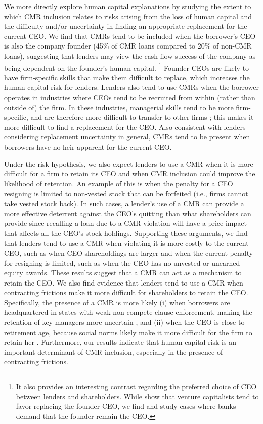 \documentclass[a4paper,12pt]{article}
\begin{document}
We more directly explore human capital explanations by studying the extent to which CMR inclusion relates to risks arising from the loss of human capital and the difficulty and/or uncertainty in finding an appropriate replacement for the current CEO.
We find that CMRs tend to be included when the borrower's CEO is also the company founder (45\% of CMR loans compared to 20\% of non-CMR loans),
suggesting that lenders may view the cash flow success of the company as being dependent on the founder's human capital.%
  \footnote{It also provides an interesting contrast regarding the preferred choice of CEO between lenders and shareholders. While \cite{Kaplan_2009} show that venture capitalists tend to favor replacing the founder CEO, we find and study cases where banks demand that the founder remain the CEO.}
Founder CEOs are likely to have firm-specific skills that make them difficult to replace, which increases the human capital risk for lenders.
Lenders also tend to use CMRs when the borrower operates in industries where CEOs tend to be recruited from within (rather than outside of) the firm.
In these industries, managerial skills tend to be more firm-specific, and are therefore more difficult to transfer to other firms \citep{Cremers_2014}; this makes it more difficult to find a replacement for the CEO.
Also consistent with lenders considering replacement uncertainty in general, CMRs tend to be present when borrowers have no heir apparent for the current CEO.



Under the risk hypothesis, we also expect lenders to use a CMR when it is more difficult for a firm to retain its CEO and when CMR inclusion could improve the likelihood of retention.
An example of this is when the penalty for a CEO resigning is limited to non-vested stock that can be forfeited (i.e., firms cannot take vested stock back).
In such cases, a lender's use of a CMR can provide a more effective deterrent against the CEO's quitting than what shareholders can provide since recalling a loan due to a CMR violation will have a price impact that affects all the CEO's stock holdings.
Supporting these arguments, we find that lenders tend to use a CMR when violating it is more costly to the current CEO, such as when CEO shareholdings are larger and when the current penalty for resigning is limited, such as when the CEO has no unvested or unearned equity awards. 
These results suggest that a CMR can act as a mechanism to retain the CEO. 
We also find evidence that lenders tend to use a CMR when contracting frictions make it more difficult for shareholders to retain the CEO.
Specifically, the presence of a CMR is more likely (i) when borrowers are headquartered in states with weak non-compete clause enforcement, making the retention of key managers more uncertain \citep{Garmaise_2011}, and (ii) when the CEO is close to retirement age, because social norms likely make it more difficult for the firm to retain her \citep{Jenter_2015a}.
Furthermore, our results indicate that human capital risk is an important determinant of CMR inclusion, especially in the presence of contracting frictions.
\end{document}
